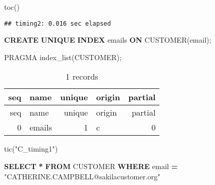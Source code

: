 \documentclass[
]{article}
\newenvironment{Shaded}{\begin{snugshade}}{\end{snugshade}}
\newcommand{\FunctionTok}[1]{\textcolor[rgb]{0.00,0.00,0.00}{#1}}
\newcommand{\KeywordTok}[1]{\textcolor[rgb]{0.13,0.29,0.53}{\textbf{#1}}}
\newcommand{\NormalTok}[1]{#1}
\newcommand{\OperatorTok}[1]{\textcolor[rgb]{0.81,0.36,0.00}{\textbf{#1}}}
\newcommand{\OtherTok}[1]{\textcolor[rgb]{0.56,0.35,0.01}{#1}}
\newcommand{\StringTok}[1]{\textcolor[rgb]{0.31,0.60,0.02}{#1}}
\begin{document}
\begin{Shaded}
\begin{Highlighting}[]
\FunctionTok{toc}\NormalTok{()}
\end{Highlighting}
\end{Shaded}

\begin{verbatim}
## timing2: 0.016 sec elapsed
\end{verbatim}

\begin{Shaded}
\begin{Highlighting}[]
\KeywordTok{CREATE} \KeywordTok{UNIQUE} \KeywordTok{INDEX}\NormalTok{ emails}
\KeywordTok{ON}\NormalTok{ CUSTOMER(email);}
\end{Highlighting}
\end{Shaded}

\begin{Shaded}
\begin{Highlighting}[]
\NormalTok{PRAGMA index\_list(}\StringTok{\textquotesingle{}CUSTOMER\textquotesingle{}}\NormalTok{);}
\end{Highlighting}
\end{Shaded}

\begin{longtable}[]{@{}rlrlr@{}}
\caption{1 records}\tabularnewline
\toprule
seq & name & unique & origin & partial \\
\midrule
\endfirsthead
\toprule
seq & name & unique & origin & partial \\
\midrule
\endhead
0 & emails & 1 & c & 0 \\
\bottomrule
\end{longtable}

\begin{Shaded}
\begin{Highlighting}[]
\FunctionTok{tic}\NormalTok{(}\StringTok{"C\_timing1"}\NormalTok{)}
\end{Highlighting}
\end{Shaded}

\begin{Shaded}
\begin{Highlighting}[]
\KeywordTok{SELECT} \OperatorTok{*} \KeywordTok{FROM}\NormalTok{ CUSTOMER}
\KeywordTok{WHERE}\NormalTok{ email }\OperatorTok{=} \OtherTok{"CATHERINE.CAMPBELL@sakilacustomer.org"}
\end{Highlighting}
\end{Shaded}
\end{document}
